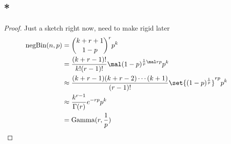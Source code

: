 \subsection{*}
\begin{proof}
	Just a sketch right now, need to make rigid later %
	\begin{align*} %
		\negBin(n,p) &= \binom{k+r+1}{1-p}^r p^k\\
		&= \frac{(k+r-1)!}{k!(r-1)!}\mal (1-p)^{\frac{1}{p}\mal rp}p^k\\
		&\approx \frac{(k+r-1)(k+r-2)\cdots(k+1)}{(r-1)!}\set{(1-p)^{\frac{1}{p}}}^{rp}p^k\\
		&\approx \frac{k^{r-1}}{\Gamma(r)}e^{-rp}p^k\\
		&= \Gam(r,\frac{1}{p})
	\end{align*}
\end{proof}